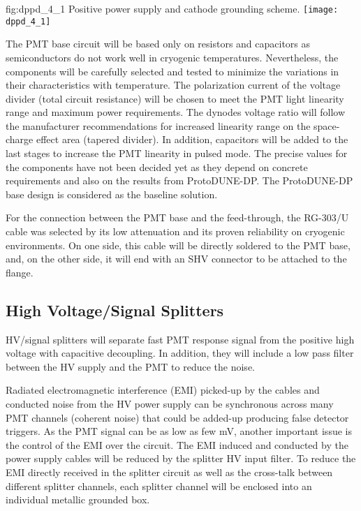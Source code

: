 \begin{dunefigure}{fig:dppd_4_1}
{Positive power supply and cathode grounding scheme.}
\texttt{[image: dppd\_4\_1]}
\end{dunefigure}

The PMT base circuit will be based only on resistors and capacitors as semiconductors do not work well in cryogenic temperatures. Nevertheless, the components will be carefully selected and tested to minimize the variations in their characteristics with temperature. The polarization current of the voltage divider (total circuit resistance) will be chosen to meet the PMT light linearity range and maximum power requirements. The dynodes voltage ratio will follow the manufacturer recommendations for increased linearity range on the space-charge effect area (tapered divider). In addition, capacitors will be added to the last stages to increase the PMT linearity in pulsed mode. The precise values for the components have not been decided yet as they depend on concrete requirements and also on the results from ProtoDUNE-DP. The ProtoDUNE-DP base design is considered as the baseline solution.

For the connection between the PMT base and the feed-through, the RG-303/U cable was selected by its low attenuation and its proven reliability on cryogenic environments. On one side, this cable will be directly soldered to the PMT base, and, on the other side, it will end with an SHV connector to be attached to the flange. 

\subsection{High Voltage/Signal Splitters}
\label{sec:fddp-pd-4.2}

HV/signal splitters will separate fast PMT response signal from the positive high voltage with capacitive decoupling. In addition, they will include a low pass filter between the HV supply and the PMT to reduce the noise.

Radiated electromagnetic interference (EMI) picked-up by the cables and conducted noise from the HV power supply can be synchronous across many PMT channels (coherent noise) that could be added-up producing false detector triggers. As the PMT signal can be as low as few mV, another important issue is the control of the EMI over the circuit. The EMI induced and conducted by the power supply cables will be reduced by the splitter HV input filter. To reduce the EMI directly received in the splitter circuit as well as the cross-talk between different splitter channels, each splitter channel will be enclosed into an individual metallic grounded box.

